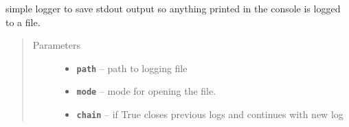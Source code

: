 \documentclass[letterpaper,10pt,english]{sphinxmanual}
\begin{document}
\begin{fulllineitems}
\label{RRtoolbox.lib:RRtoolbox.lib.root.StdoutLOG}
simple logger to save stdout output
so anything printed in the console is logged to a file.
\begin{quote}\begin{description}
\item[{Parameters}] \leavevmode\begin{itemize}
\item {} 
\textbf{\texttt{path}} -- path to logging file

\item {} 
\textbf{\texttt{mode}} -- mode for opening the file.

\item {} 
\textbf{\texttt{chain}} -- if True closes previous logs and continues with new log

\end{itemize}

\end{description}\end{quote}

\begin{fulllineitems}
\label{RRtoolbox.lib:RRtoolbox.lib.root.StdoutLOG.close}
\end{fulllineitems}


\begin{fulllineitems}
\label{RRtoolbox.lib:RRtoolbox.lib.root.StdoutLOG.flush}
\end{fulllineitems}


\begin{fulllineitems}
\label{RRtoolbox.lib:RRtoolbox.lib.root.StdoutLOG.printline}
\end{fulllineitems}


\begin{fulllineitems}
\label{RRtoolbox.lib:RRtoolbox.lib.root.StdoutLOG.printlines}
\end{fulllineitems}


\begin{fulllineitems}
\label{RRtoolbox.lib:RRtoolbox.lib.root.StdoutLOG.write}
\end{fulllineitems}


\end{fulllineitems}
\end{document}
